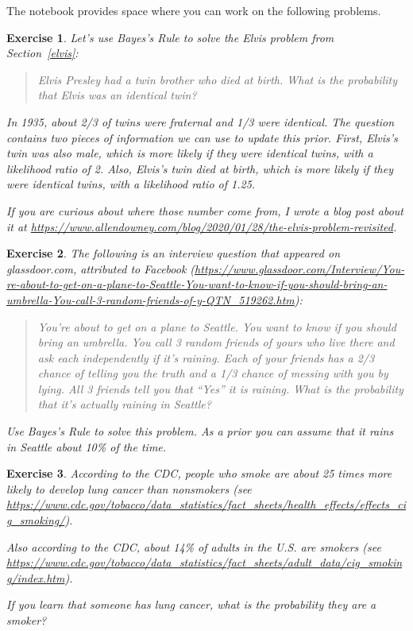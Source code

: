 \documentclass[12pt]{book}
\theoremstyle{exercise}
\newtheorem{exercise}{Exercise}[chapter]
\begin{document}
The notebook provides space where you can work on the following problems.


\begin{exercise}
Let's use Bayes's Rule to solve the Elvis problem from Section~\ref{elvis}:

\begin{quote}
Elvis Presley had a twin brother who died at birth. What is the probability that Elvis was an identical twin?
\end{quote}

In 1935, about 2/3 of twins were fraternal and 1/3 were identical.
The question contains two pieces of information we can use to update this prior.
First, Elvis's twin was also male, which is more likely if they were identical twins, with a likelihood ratio of 2.
Also, Elvis's twin died at birth, which is more likely if they were identical twins, with a likelihood ratio of 1.25.

If you are curious about where those number come from, I wrote a blog post about it at \url{https://www.allendowney.com/blog/2020/01/28/the-elvis-problem-revisited}.
\end{exercise}


\begin{exercise}
The following is an interview question that appeared on glassdoor.com, attributed to Facebook (\url{https://www.glassdoor.com/Interview/You-re-about-to-get-on-a-plane-to-Seattle-You-want-to-know-if-you-should-bring-an-umbrella-You-call-3-random-friends-of-y-QTN_519262.htm}):

\begin{quote}
You're about to get on a plane to Seattle. You want to know if you should bring an umbrella. You call 3 random friends of yours who live there and ask each independently if it's raining. Each of your friends has a 2/3 chance of telling you the truth and a 1/3 chance of messing with you by lying. All 3 friends tell you that ``Yes'' it is raining. What is the probability that it's actually raining in Seattle?
\end{quote}

Use Bayes's Rule to solve this problem.  As a prior you can assume that it rains in Seattle about 10\% of the time.
\end{exercise}


\begin{exercise}
According to the CDC, people who smoke are about 25 times more likely to develop lung cancer than nonsmokers (see \url{https://www.cdc.gov/tobacco/data_statistics/fact_sheets/health_effects/effects_cig_smoking/}).

Also according to the CDC, about 14\% of adults in the U.S. are smokers (see \url{https://www.cdc.gov/tobacco/data_statistics/fact_sheets/adult_data/cig_smoking/index.htm}).

If you learn that someone has lung cancer, what is the probability they are a smoker?
\end{exercise}
\end{document}
